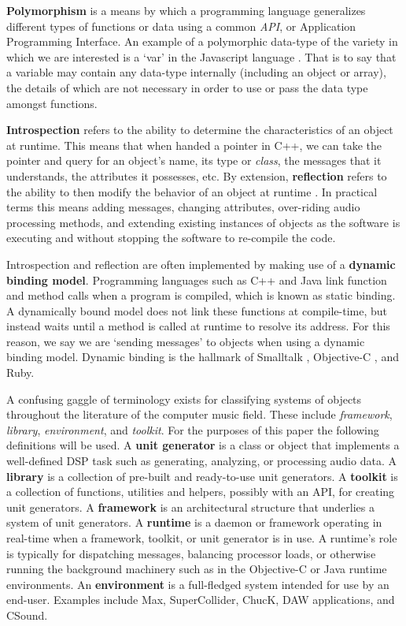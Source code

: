 \documentclass[twoside,10pt]{article}
\begin{document}
\textbf{Polymorphism} is a means by which a programming language generalizes different types of functions or data using a common \emph{API}, or Application Programming Interface.  An example of a polymorphic data-type of the variety in which we are interested is a `var' in the Javascript language \cite{Flanagan:2002}.  That is to say that a variable may contain any data-type internally (including an object or array), the details of which are not necessary in order to use or pass the data type amongst functions.

\textbf{Introspection} refers to the ability to determine the characteristics of an object at runtime.  This means that when handed a pointer in C++, we can take the pointer and query for an object's name, its type or \emph{class}, the messages that it understands, the attributes it possesses, etc.  By extension, \textbf{reflection} refers to the ability to then modify the behavior of an object at runtime \cite{Malenfant:1996}.  In practical terms this means adding messages, changing attributes, over-riding audio processing methods, and extending existing instances of objects as the software is executing and without stopping the software to re-compile the code.

Introspection and reflection are often implemented by making use of a \textbf{dynamic binding model}.  Programming languages such as C++ and Java link function and method calls when a program is compiled, which is known as static binding.  A dynamically bound model does not link these functions at compile-time, but instead waits until a method is called at runtime to resolve its address.  For this reason, we say we are `sending messages' to objects when using a dynamic binding model.  Dynamic binding is the hallmark of Smalltalk \cite{Krasner:1988}, Objective-C \cite{Cox:1986}, and Ruby.

A confusing gaggle of terminology exists for classifying systems of objects throughout the literature of the computer music field.  These include \emph{framework}, \emph{library}, \emph{environment}, and \emph{toolkit}.  For the purposes of this paper the following definitions will be used.  
A \textbf{unit generator} is a class or object that implements a well-defined DSP task such as generating, analyzing, or processing audio data.
A \textbf{library} is a collection of pre-built and ready-to-use unit generators.
A \textbf{toolkit} is a collection of functions, utilities and helpers, possibly with an API, for creating unit generators.
A \textbf{framework} is an architectural structure that underlies a system of unit generators.
A \textbf{runtime} is a daemon or framework operating in real-time when a framework, toolkit, or unit generator is in use. A runtime's role is typically for dispatching messages, balancing processor loads, or otherwise running the background machinery such as in the Objective-C or Java runtime environments.
An \textbf{environment} is a full-fledged system intended for use by an end-user.  Examples include Max, SuperCollider, ChucK, DAW applications, and CSound.
\end{document}
